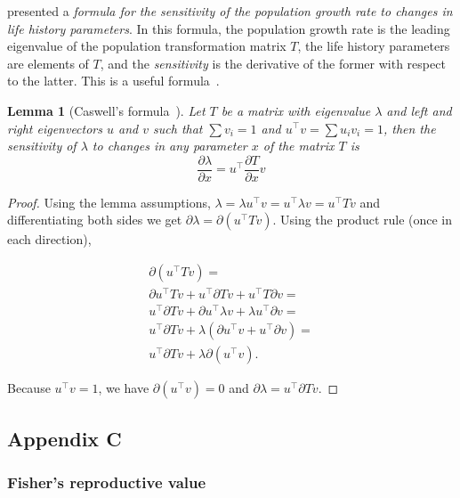\documentclass[a4paper,twocolumn]{article}   	%
\newcommand*{\tr}{^\intercal}
\newtheorem*{lemma}{Lemma}
\begin{document}
\citet{Caswell1978} presented a \emph{formula for the sensitivity of the population growth rate to changes in life history parameters}.
In this formula, the population growth rate is the leading eigenvalue of the population transformation matrix $T$, the life history parameters are elements of $T$, and the \emph{sensitivity} is the derivative of the former with respect
to the latter.
This is a useful formula~\citep{Hermisson2002,Ram2012}.

\begin{lemma}[Caswell's formula~\citep{Caswell1978}]
Let $T$ be a matrix with eigenvalue $\lambda$ and left and right eigenvectors $u$ and $v$ such that $\sum{v_i}=1$ and $u\tr v = \sum{u_i v_i} = 1$,
then the sensitivity of $\lambda$ to changes in any parameter $x$ of the matrix $T$ is
\begin{equation}\label{eq:Caswells_formula}
\frac{\partial \lambda}{\partial x} = 
u\tr \frac{\partial T}{\partial x} v
\end{equation}
\end{lemma}

\begin{proof} 
Using the lemma assumptions,
$\lambda = \lambda u\tr v = u\tr \lambda v = u\tr T v$ and differentiating both sides we get $\partial \lambda = \partial (u\tr T v)$.
Using the product rule (once in each direction),

\begin{multline*}
\partial (u\tr T v) = \\
\partial u\tr T v + u\tr \partial T v + u\tr T \partial v = \\
u\tr \partial T v + \partial u\tr \lambda v  + \lambda u\tr \partial v = \\
u\tr \partial T v + \lambda(\partial u\tr v  + u\tr \partial v) = \\
u\tr \partial T v + \lambda \partial(u\tr v).
\end{multline*}

Because $u\tr v = 1$,
we have $\partial (u\tr v) = 0$ and
$\partial \lambda = u\tr \partial T v$.
\end{proof}

\subsection*{Appendix C}\label{sec:AppC}
\subsubsection*{Fisher's reproductive value}
\end{document}
